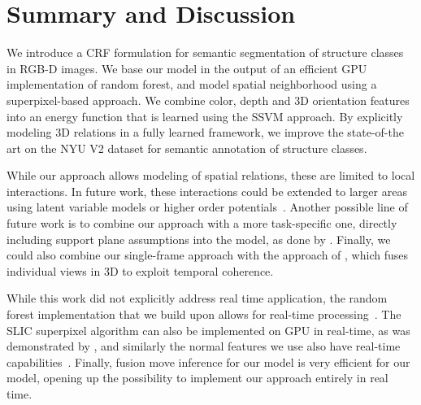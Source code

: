 \section{Summary and Discussion}
We introduce a CRF formulation for semantic segmentation
of structure classes in RGB-D images. We base our model in the output of an efficient GPU implementation
of random forest, and model spatial neighborhood using a superpixel-based approach.
We combine color, depth and 3D orientation features into an energy function
that is learned using the SSVM approach. By explicitly modeling 3D relations in
a fully learned framework, we improve the state-of-the art on the NYU V2
dataset for semantic annotation of structure classes.


While our approach allows modeling of spatial relations, these are limited to
local interactions. In future work, these interactions could be extended to
larger areas using latent variable models or higher
order potentials~\citep{ladicky2009associative}.
Another possible line of future work is to combine our approach with a more
task-specific one, directly including support plane assumptions into the model,
as done by \citet{SilbermanECCV12}. Finally, we could also combine our
single-frame approach with the approach of \citet{stueckler2013}, which fuses
individual views in 3D to exploit temporal coherence.

While this work did not explicitly address real time application, the random
forest implementation that we build upon allows for real-time
processing~\citep{stueckler2013}. The SLIC superpixel algorithm can also be
implemented on GPU in real-time, as was demonstrated by \citep{ren2011gslic}, and similarly
the normal features we use also have
real-time capabilities~\citep{holz_2011_robocup}.
Finally, fusion move inference for our model is very efficient for our model,
opening up the possibility to implement our approach entirely in real time.
